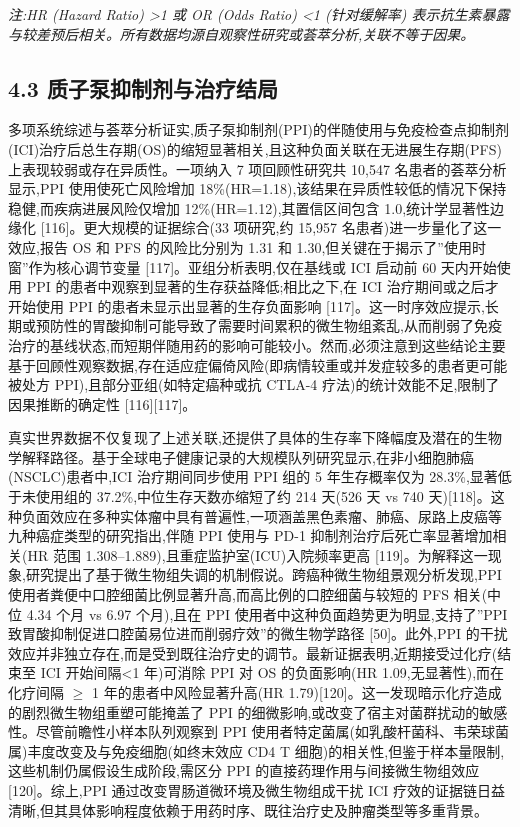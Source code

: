 \documentclass[11pt]{article}
\begin{document}
\emph{注:HR (Hazard Ratio) \textgreater1 或 OR (Odds Ratio) \textless1 (针对缓解率) 表示抗生素暴露与较差预后相关。所有数据均源自观察性研究或荟萃分析,关联不等于因果。}

\subsection{4.3 质子泵抑制剂与治疗结局}\label{ux8d28ux5b50ux6cf5ux6291ux5236ux5242ux4e0eux6cbbux7597ux7ed3ux5c40}

多项系统综述与荟萃分析证实,质子泵抑制剂(PPI)的伴随使用与免疫检查点抑制剂(ICI)治疗后总生存期(OS)的缩短显著相关,且这种负面关联在无进展生存期(PFS)上表现较弱或存在异质性。一项纳入 7 项回顾性研究共 10,547 名患者的荟萃分析显示,PPI 使用使死亡风险增加 18\%(HR=1.18),该结果在异质性较低的情况下保持稳健,而疾病进展风险仅增加 12\%(HR=1.12),其置信区间包含 1.0,统计学显著性边缘化 {[}116{]}。更大规模的证据综合(33 项研究,约 15,957 名患者)进一步量化了这一效应,报告 OS 和 PFS 的风险比分别为 1.31 和 1.30,但关键在于揭示了''使用时窗''作为核心调节变量 {[}117{]}。亚组分析表明,仅在基线或 ICI 启动前 60 天内开始使用 PPI 的患者中观察到显著的生存获益降低;相比之下,在 ICI 治疗期间或之后才开始使用 PPI 的患者未显示出显著的生存负面影响 {[}117{]}。这一时序效应提示,长期或预防性的胃酸抑制可能导致了需要时间累积的微生物组紊乱,从而削弱了免疫治疗的基线状态,而短期伴随用药的影响可能较小。然而,必须注意到这些结论主要基于回顾性观察数据,存在适应症偏倚风险(即病情较重或并发症较多的患者更可能被处方 PPI),且部分亚组(如特定癌种或抗 CTLA-4 疗法)的统计效能不足,限制了因果推断的确定性 {[}116{]}{[}117{]}。

真实世界数据不仅复现了上述关联,还提供了具体的生存率下降幅度及潜在的生物学解释路径。基于全球电子健康记录的大规模队列研究显示,在非小细胞肺癌(NSCLC)患者中,ICI 治疗期间同步使用 PPI 组的 5 年生存概率仅为 28.3\%,显著低于未使用组的 37.2\%,中位生存天数亦缩短了约 214 天(526 天 vs 740 天){[}118{]}。这种负面效应在多种实体瘤中具有普遍性,一项涵盖黑色素瘤、肺癌、尿路上皮癌等九种癌症类型的研究指出,伴随 PPI 使用与 PD-1 抑制剂治疗后死亡率显著增加相关(HR 范围 1.308--1.889),且重症监护室(ICU)入院频率更高 {[}119{]}。为解释这一现象,研究提出了基于微生物组失调的机制假说。跨癌种微生物组景观分析发现,PPI 使用者粪便中口腔细菌比例显著升高,而高比例的口腔细菌与较短的 PFS 相关(中位 4.34 个月 vs 6.97 个月),且在 PPI 使用者中这种负面趋势更为明显,支持了''PPI 致胃酸抑制促进口腔菌易位进而削弱疗效''的微生物学路径 {[}50{]}。此外,PPI 的干扰效应并非独立存在,而是受到既往治疗史的调节。最新证据表明,近期接受过化疗(结束至 ICI 开始间隔\textless1 年)可消除 PPI 对 OS 的负面影响(HR 1.09,无显著性),而在化疗间隔 \(\geq\) 1 年的患者中风险显著升高(HR 1.79){[}120{]}。这一发现暗示化疗造成的剧烈微生物组重塑可能掩盖了 PPI 的细微影响,或改变了宿主对菌群扰动的敏感性。尽管前瞻性小样本队列观察到 PPI 使用者特定菌属(如乳酸杆菌科、韦荣球菌属)丰度改变及与免疫细胞(如终末效应 CD4 T 细胞)的相关性,但鉴于样本量限制,这些机制仍属假设生成阶段,需区分 PPI 的直接药理作用与间接微生物组效应 {[}120{]}。综上,PPI 通过改变胃肠道微环境及微生物组成干扰 ICI 疗效的证据链日益清晰,但其具体影响程度依赖于用药时序、既往治疗史及肿瘤类型等多重背景。
\end{document}
